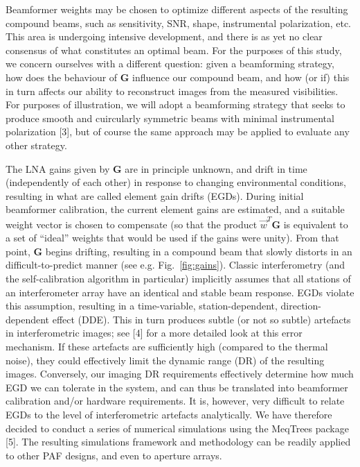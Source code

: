 \documentclass{aps2010} \special{papersize=8.5in,11in}
\begin{document}
Beamformer weights may be chosen to optimize different aspects of the resulting compound beams, such as sensitivity, SNR, shape, instrumental polarization, etc. This area is undergoing intensive development, and there is as yet no clear consensus of what constitutes an optimal beam. For the purposes of this study, we concern ourselves with a different question: given a beamforming strategy, how does the behaviour of $\mathbf{G}$ influence our compound beam, and how (or if) this in turn affects our ability to reconstruct images from the measured visibilities. For purposes of illustration, we will adopt a beamforming strategy that seeks to produce smooth and cuircularly symmetric beams with minimal instrumental polarization [3], but of course the same approach may be applied to evaluate any other strategy.

The LNA gains given by $\mathbf{G}$ are in principle unknown, and drift in time (independently of each other) in response to changing environmental conditions, resulting in what are called element gain drifts (EGDs). During initial beamformer calibration, the current element gains are estimated, and a suitable weight vector is chosen to compensate (so that the product $\vec w^T\mathbf{G}$ is equivalent to a set of ``ideal'' weights that would be used if the gains were unity). From that point, $\mathbf{G}$ begins drifting, resulting in a compound beam that slowly distorts in an difficult-to-predict manner (see e.g. Fig.~\ref{fig:gains}). Classic interferometry (and the self-calibration algorithm in particular) implicitly assumes that all stations of an interferometer array have an identical and stable beam response. EGDs violate this assumption, resulting in a time-variable, station-dependent, direction-dependent effect (DDE). This in turn produces subtle (or not so subtle) artefacts in interferometric images; see [4] for a more detailed look at this error mechanism. If these artefacts are sufficiently high (compared to the thermal noise), they could effectively limit the dynamic range (DR) of the resulting images. Conversely, our imaging DR requirements effectively determine how much EGD we can tolerate in the system, and can thus be translated into beamformer calibration and/or hardware requirements. It is, however, very difficult to relate EGDs to the level of interferometric artefacts analytically. We have therefore decided to conduct a series of numerical simulations using the MeqTrees package [5]. The resulting simulations framework and methodology can be readily applied to other PAF designs, and even to aperture arrays.
\end{document}
